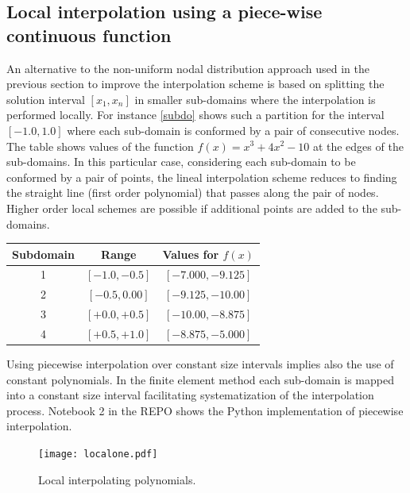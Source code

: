 \subsection{Local interpolation using a piece-wise continuous function}
An alternative to the non-uniform nodal distribution approach used in the previous section to improve the interpolation scheme is based on splitting the solution interval $[x_1, x_n]$ in smaller sub-domains where the interpolation is performed locally. For instance \cref{subdo} shows such a partition for the interval $[-1.0, 1.0]$ where each sub-domain is conformed by a pair of consecutive nodes. The table shows values of the function $f(x) = {x^3} + 4{x^2} - 10$ at the edges of the sub-domains. In this particular case, considering each sub-domain to be conformed by a pair of points, the lineal interpolation scheme reduces to finding the straight line (first order polynomial) that passes along the pair of nodes. Higher order local schemes are possible if additional points are added to the sub-domains.

\begin{center}
\begin{tabular}{ccc}
  \hline
  Subdomain & Range & Values for $f(x)$ \\
  \hline 
   1  & $[-1.0, -0.5]$ & $[-7.000, -9.125]$  \\
   2  & $[-0.5,  0.00]$ & $[-9.125, -10.00]$  \\
   3  & $[+0.0,  +0.5]$ & $[-10.00, -8.875]$   \\
   4  & $[+0.5, +1.0]$ & $[-8.875, -5.000]$   \\
  \hline
\end{tabular}
\label{subdo}
\end{center}

\begin{tcolorbox}

Using piecewise interpolation over constant size intervals implies also the use of constant polynomials. In the finite element method each sub-domain is mapped into a constant size interval facilitating systematization of the interpolation process.
Notebook 2 in the REPO shows the Python implementation of piecewise interpolation.

\end{tcolorbox}


\begin{figure}[H]
  \centering
  \texttt{[image: localone.pdf]}
  \caption{Local interpolating polynomials.}
  \label{fig:loc-pols}
\end{figure}

